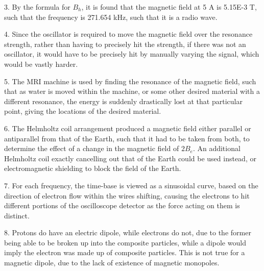 \documentclass[11pt]{article}
\begin{document}
3. By the formula for $B_h$, it is found that the magnetic field at 5 A is 5.15E-3 T, such that the frequency is 271.654 kHz, such that it is a radio wave.

4. Since the oscillator is required to move the magnetic field over the resonance strength, rather than having to precisely hit the strength, if there was not an oscillator, it would have to be precisely hit by manually varying the signal, which would be vastly harder.

5. The MRI machine is used by finding the resonance of the magnetic field, such that as water is moved within the machine, or some other desired material with a different resonance, the energy is suddenly drastically lost at that particular point, giving the locations of the desired material.

6. The Helmholtz coil arrangement produced a magnetic field either parallel or antiparallel from that of the Earth, such that it had to be taken from both, to determine the effect of a change in the magnetic field of $2B_e$. An additional Helmholtz coil exactly cancelling out that of the Earth could be used instead, or electromagnetic shielding to block the field of the Earth.

7. For each frequency, the time-base is viewed as a sinusoidal curve, based on the direction of electron flow within the wires shifting, causing the electrons to hit different portions of the oscilloscope detector as the force acting on them is distinct.

8. Protons do have an electric dipole, while electrons do not, due to the former being able to be broken up into the composite particles, while a dipole would imply the electron was made up of composite particles. This is not true for a magnetic dipole, due to the lack of existence of magnetic monopoles.

\end{document}

